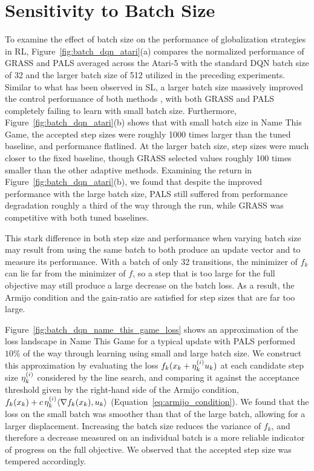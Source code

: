 \section{Sensitivity to Batch Size} \label{sec:batch_size}
To examine the effect of batch size on the performance of globalization strategies in RL, Figure~\ref{fig:batch_dqn_atari}(a) compares the normalized performance of GRASS and PALS averaged across the Atari-5 with the standard DQN batch size of 32 and the larger batch size of 512 utilized in the preceding experiments. Similar to what has been observed in SL, a larger batch size massively improved the control performance of both methods \cite{roulet2023interplay}, with both GRASS and PALS completely failing to learn with small batch size. Furthermore, Figure~\ref{fig:batch_dqn_atari}(b) shows that with small batch size in Name This Game, the accepted step sizes were roughly 1000 times larger than the tuned baseline, and performance flatlined. At the larger batch size, step sizes were much closer to the fixed baseline, though GRASS selected values roughly 100 times smaller than the other adaptive methods. Examining the return in Figure~\ref{fig:batch_dqn_atari}(b), we found that despite the improved performance with the large batch size, PALS still suffered from performance degradation roughly a third of the way through the run, while GRASS was competitive with both tuned baselines.

This stark difference in both step size and performance when varying batch size may result from using the same batch to both produce an update vector and to measure its performance. With a batch of only 32 transitions, the minimizer of $f_k$ can lie far from the minimizer of $f$, so a step that is too large for the full objective may still produce a large decrease on the batch loss. As a result, the Armijo condition and the gain-ratio are satisfied for step sizes that are far too large.

Figure~\ref{fig:batch_dqn_name_this_game_loss} shows an approximation of the loss landscape in Name This Game for a typical update with PALS performed $10\%$ of the way through learning using small and large batch size. We construct this approximation by evaluating the loss $f_k(x_{k} + \eta_{k}^{(i)} u_{k})$ at each candidate step size $\eta_{k}^{(i)}$ considered by the line search, and comparing it against the acceptance threshold given by the right-hand side of the Armijo condition, $f_k(x_{k}) + c\, \eta_{k}^{(i)} \langle \nabla f_k(x_{k}), u_{k} \rangle$ (Equation~\eqref{eq:armijo_condition}).
We found that the loss on the small batch was smoother than that of the large batch, allowing for a larger displacement. Increasing the batch size reduces the variance of $f_k$, and therefore a decrease measured on an individual batch is a more reliable indicator of progress on the full objective. We observed that the accepted step size was tempered accordingly.


